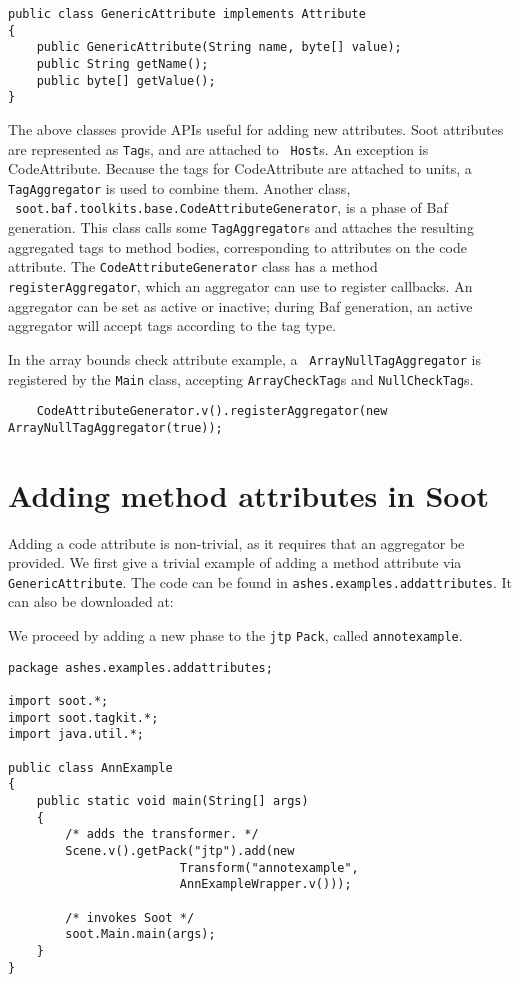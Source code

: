 \documentclass{article}
\begin{document}
\begin{description}
\begin{verbatim}
public class GenericAttribute implements Attribute
{
    public GenericAttribute(String name, byte[] value);
    public String getName();
    public byte[] getValue();
}    
\end{verbatim}
\end{description}
     
The above classes provide APIs useful for adding new attributes. Soot
attributes are represented as {\tt Tag}s, and are attached to {\tt
Host}s.  An exception is CodeAttribute. Because the tags for
CodeAttribute are attached to units, a {\tt TagAggregator} is used to
combine them. Another class, \\ {\tt
soot.baf.toolkits.base.CodeAttributeGenerator}, is a phase of Baf
generation.  This class calls some {\tt TagAggregator}s and attaches the
resulting aggregated tags to method bodies, corresponding to
attributes on the code attribute. The {\tt CodeAttributeGenerator}
class has a method {\tt registerAggregator}, which an aggregator can
use to register callbacks. An aggregator can be set as active or
inactive; during Baf generation, an active aggregator will accept tags
according to the tag type.

In the array bounds check attribute example, a {\tt
ArrayNullTagAggregator} is registered by the {\tt Main} class, accepting
{\tt ArrayCheckTag}s and {\tt NullCheckTag}s.

\begin{verbatim}
    CodeAttributeGenerator.v().registerAggregator(new ArrayNullTagAggregator(true));
\end{verbatim}

\section{Adding method attributes in Soot}
Adding a code attribute is non-trivial, as it requires that an aggregator
be provided.  We first give a trivial example of adding a method attribute
via {\tt GenericAttribute}. The code can be found in {\tt ashes.examples.addattributes}.
It can also be downloaded at:


We proceed by adding a new phase to the {\tt jtp} {\tt Pack}, called
{\tt annotexample}.

\begin{verbatim}
package ashes.examples.addattributes;

import soot.*;
import soot.tagkit.*;
import java.util.*;

public class AnnExample
{
    public static void main(String[] args)
    {
        /* adds the transformer. */
        Scene.v().getPack("jtp").add(new
                        Transform("annotexample",
                        AnnExampleWrapper.v()));

        /* invokes Soot */
        soot.Main.main(args);
    }
}
\end{verbatim}
\end{document}
